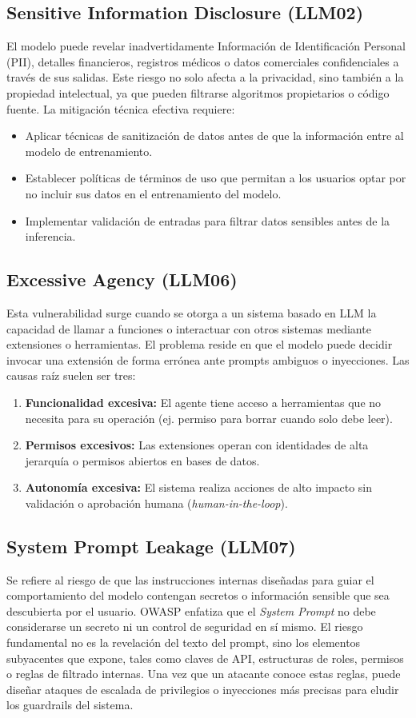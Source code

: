 \documentclass[12pt]{article}
\begin{document}
\subsection{Sensitive Information Disclosure (LLM02)}
El modelo puede revelar inadvertidamente Información de Identificación Personal (PII), detalles financieros, registros médicos o datos comerciales confidenciales a través de sus salidas. Este riesgo no solo afecta a la privacidad, sino también a la propiedad intelectual, ya que pueden filtrarse algoritmos propietarios o código fuente. 
La mitigación técnica efectiva requiere:
\begin{itemize}
    \item Aplicar técnicas de sanitización de datos antes de que la información entre al modelo de entrenamiento.
    \item Establecer políticas de términos de uso que permitan a los usuarios optar por no incluir sus datos en el entrenamiento del modelo.
    \item Implementar validación de entradas para filtrar datos sensibles antes de la inferencia.
\end{itemize}

\subsection{Excessive Agency (LLM06)}
Esta vulnerabilidad surge cuando se otorga a un sistema basado en LLM la capacidad de llamar a funciones o interactuar con otros sistemas mediante extensiones o herramientas. El problema reside en que el modelo puede decidir invocar una extensión de forma errónea ante prompts ambiguos o inyecciones. 
Las causas raíz suelen ser tres:
\begin{enumerate}
    \item \textbf{Funcionalidad excesiva:} El agente tiene acceso a herramientas que no necesita para su operación (ej. permiso para borrar cuando solo debe leer).
    \item \textbf{Permisos excesivos:} Las extensiones operan con identidades de alta jerarquía o permisos abiertos en bases de datos.
    \item \textbf{Autonomía excesiva:} El sistema realiza acciones de alto impacto sin validación o aprobación humana (\textit{human-in-the-loop}).
\end{enumerate}

\subsection{System Prompt Leakage (LLM07)}
Se refiere al riesgo de que las instrucciones internas diseñadas para guiar el comportamiento del modelo contengan secretos o información sensible que sea descubierta por el usuario. OWASP enfatiza que el \textit{System Prompt} no debe considerarse un secreto ni un control de seguridad en sí mismo.
El riesgo fundamental no es la revelación del texto del prompt, sino los elementos subyacentes que expone, tales como claves de API, estructuras de roles, permisos o reglas de filtrado internas. Una vez que un atacante conoce estas reglas, puede diseñar ataques de escalada de privilegios o inyecciones más precisas para eludir los guardrails del sistema.
\end{document}
